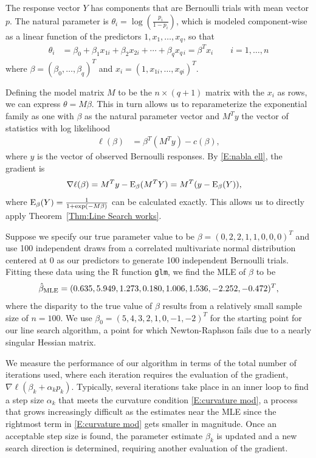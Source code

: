 The response vector $Y$ has components that are Bernoulli trials with mean vector $p$.  
The natural parameter is $
\theta_i = \log \left( \frac{p_i}{1-p_i} \right )$, which is modeled component-wise as 
a linear function of the 
predictors $1, x_1, \ldots, x_{q}$, so that
\begin{align*}
	\theta_i &= \beta_0 + \beta_1 x_{1i} + \beta_2 x_{2i} + \cdots + \beta_{q} x_{q
\,i} = \beta^T x_i \qquad
i = 1, \ldots, n
\end{align*}
where $\beta = (\beta_0, \ldots, \beta_{q} )^T$ and $x_i = ( 1, x_{1i}, \ldots, x_{q 
i})^T$.  

Defining the model matrix $M$ to be the $n \times (q+1)$ matrix with the $x_i$ as 
rows, we can express $\theta = M \beta
$.  This in turn allows us to reparameterize the exponential family  as one with $
\beta$ as the natural parameter 
vector and $M^T y$ the vector of statistics with log likelihood
\begin{align*}
		 \ell(\beta) &=  \beta^T (M^T y) - c(\beta),
\end{align*}
where $y$ is the vector of observed Bernoulli responses.
By \eqref{E:nabla ell}, the gradient is
\begin{align*}
	\nabla \ell( \beta ) &=  M^T y - \operatorname{E}_{\beta}(M^T Y) = M^T( y - \operatorname{E}_{\beta}(Y) ),
\end{align*}
where $\operatorname{E}_{\beta}(Y) = \frac{1}{1 + \exp(-M \beta)}$ can be calculated exactly.  This 
allows us to directly apply 
Theorem~\ref{Thm:Line Search works}.

Suppose we specify our true parameter value to be $\beta = (0, 2, 2, 1, 1, 0, 0, 0)^T$ 
and use 100 independent draws 
from a correlated multivariate normal distribution centered at 0 as our predictors to 
generate 100 independent 
Bernoulli trials.  
Fitting these data using the R function \texttt{glm}, we find the MLE of $\beta$ to be
\begin{align*}
	\hat{\beta}_{\textrm{MLE}} = (  0.635,  5.949, 1.273, 0.180, 1.006, 1.536, -2.252, -0.472 )^T,
\end{align*}
where the disparity to the true value of $\beta$ results from a relatively small 
sample size of $n=100$.
We use $\beta_0 = ( 5, 4, 3, 2, 1, 0, -1, -2)^T$ for the starting point for our line 
search algorithm, a point for 
which Newton-Raphson fails due to a nearly singular Hessian matrix.  

We measure the performance of our algorithm in terms of the total number of iterations 
used, where each iteration 
requires the evaluation of the gradient, $\nabla \ell( \beta_k + \alpha_k p_k )$.  
Typically, several iterations take 
place in an inner loop to find a step size $\alpha_k$ that meets the curvature 
condition \eqref{E:curvature mod}, a 
process that grows increasingly difficult as the estimates near the MLE since the 
rightmost term in \eqref{E:curvature 
mod} gets smaller in magnitude.  Once an acceptable step size is found, the parameter 
estimate $\beta_k$ is updated and 
a new search direction is determined, requiring another evaluation of the gradient.

